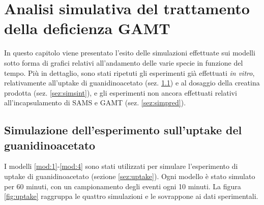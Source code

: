 \chapter{Analisi simulativa del trattamento della deficienza GAMT}\label{cap:simulazione}
In questo capitolo viene presentato l'esito delle simulazioni effettuate sui modelli sotto forma di grafici relativi all'andamento delle varie specie in funzione del tempo.
Pi\`u in dettaglio, sono stati ripetuti gli esperimenti gi\`a effettuati \emph{in vitro}, relativamente all'uptake di guanidinoacetato (sez. \ref{sez:simup}) e al dosaggio della creatina prodotta (sez. \ref{sez:simsint}), e gli esperimenti non ancora effettuati relativi all'incapsulamento di SAMS e GAMT (sez. \ref{sez:simpred}).


\section{Simulazione dell'esperimento sull'uptake del guanidinoacetato}\label{sez:simup}
I modelli \ref{mod:1}-\ref{mod:4} sono stati utilizzati per simulare l'esperimento di uptake di guanidinoacetato (sezione \ref{sez:uptake}).
Ogni modello \`e stato simulato per 60 minuti, con un campionamento degli eventi ogni 10 minuti.
La figura \ref{fig:uptake} raggruppa le quattro simulazioni e le sovrappone ai dati sperimentali.
